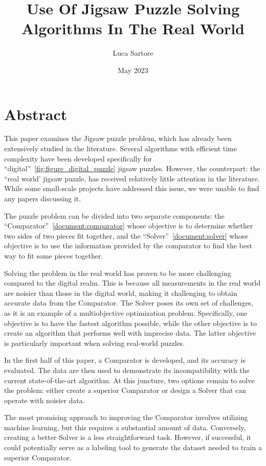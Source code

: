 \documentclass{article}
\title{Use Of Jigsaw Puzzle Solving Algorithms In The Real World}
\author{Luca Sartore}
\date{May 2023}
\begin{document}
\maketitle

\newpage

{
  \hypersetup{linkcolor=black}
  \tableofcontents
}

\newpage

\section{Abstract}
This paper examines the Jigsaw puzzle problem,
which has already been extensively studied in the literature.
Several algorithms with efficient time complexity have been developed
specifically for ``digital''~\ref{fig:figure_digital_puzzle} jigsaw puzzles. However, the counterpart:
the ``real world' jigsaw puzzle, has received relatively little attention
in the literature. While some small-scale projects have addressed this issue,
we were unable to find any papers discussing it.

The puzzle problem can be divided into two separate components: the ``Comparator''~\ref{document:comparator}
whose objective is to determine whether two sides of two pieces fit together,
and the ``Solver''~\ref{document:solver} whose objective is to use the information provided
by the comparator to find the best way to fit some pieces together.

Solving the problem in the real world has proven to be more challenging compared
to the digital realm.
This is because all measurements in the real world are noisier than those
in the digital world, making it challenging to obtain accurate data from the Comparator.
The Solver poses its own set of challenges, as it is an example of a
multiobjective optimization problem. Specifically, one objective is to have
the fastest algorithm possible,
while the other objective is to create an algorithm that performs well with
imprecise data. The latter objective is particularly important when solving
real-world puzzles.

In the first half of this paper, a Comparator is developed, and its accuracy
is evaluated.
The data are then used to demonstrate its incompatibility with the current
state-of-the-art algorithm. At this juncture,
two options remain to solve the problem:
either create a superior Comparator or design a
Solver that can operate with noisier data.

The most promising approach to improving the Comparator
involves utilizing machine learning, but this requires a substantial amount of data.
Conversely, creating a better Solver is a less straightforward task.
However, if successful, it could potentially serve as a labeling tool
to generate the dataset needed to train a superior Comparator.
\end{document}
